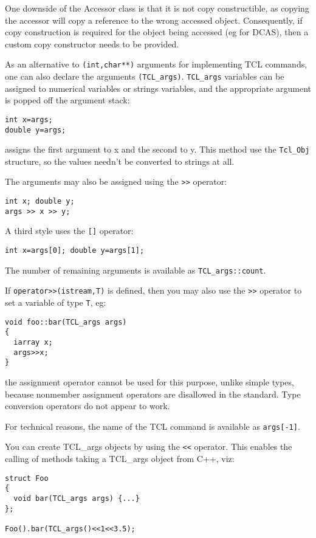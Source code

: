 One downside of the Accessor class is that it is not copy
constructible, as copying the accessor will copy a reference to the
wrong accessed object. Consequently, if copy construction is required
for the object being accessed (eg for DCAS), then a custom copy
constructor needs to be provided.

As an alternative to \verb+(int,char**)+ arguments for implementing
TCL commands, one can also declare the arguments
\verb+(TCL_args)+. \verb+TCL_args+ variables can be
assigned to numerical variables or strings variables, and the
appropriate argument is popped off the argument stack:
\begin{verbatim}
int x=args;
double y=args;
\end{verbatim}
assigns the first argument to x and the second to y. This method use
the \verb+Tcl_Obj+ structure, so the values needn't be converted to
strings at all.

The arguments may also be assigned using the \verb+>>+ operator:
\begin{verbatim}
int x; double y;
args >> x >> y;
\end{verbatim}

A third style uses the \verb+[]+ operator:
\begin{verbatim}
int x=args[0]; double y=args[1];
\end{verbatim}
The number of remaining arguments is available as
\verb+TCL_args::count+.

If \verb+operator>>(istream,T)+ is defined, then you may also use the
\verb+>>+ operator to set a variable of type \verb+T+, eg:
\begin{verbatim}
void foo::bar(TCL_args args)
{
  iarray x;
  args>>x;
}
\end{verbatim}
the assignment operator cannot be used for this purpose, unlike simple
types, because nonmember assignment operators are disallowed in the
standard. Type conversion operators do not appear to work.

For technical reasons, the name of the TCL command is available as
\verb+args[-1]+. 

You can create TCL\_args objects by using the \verb+<<+ operator. This
enables the calling of methods taking a TCL\_args object from C++,
viz:
\begin{verbatim}
struct Foo
{
  void bar(TCL_args args) {...}
};

Foo().bar(TCL_args()<<1<<3.5);
\end{verbatim}


